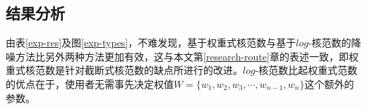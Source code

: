 \documentclass[12pt, a4paper]{article}
\begin{document}
\subsection{结果分析}
\par 由表\ref{exp-res}及图\ref{exp-types}，不难发现，基于权重式核范数与基于$log$-核范数的降噪方法比另外两种方法更加有效，这与本文第\ref{research-route}章的表述一致，即权重式核范数是针对截断式核范数的缺点所进行的改进。$log$-核范数比起权重式范数的优点在于，使用者无需事先决定权值$W=\{w_1, w_2, w_3, \cdots, w_{n-1}, w_n\}$这个额外的参数。
\begin{figure}[h]
\centering
{}

\end{figure}
\end{document}
